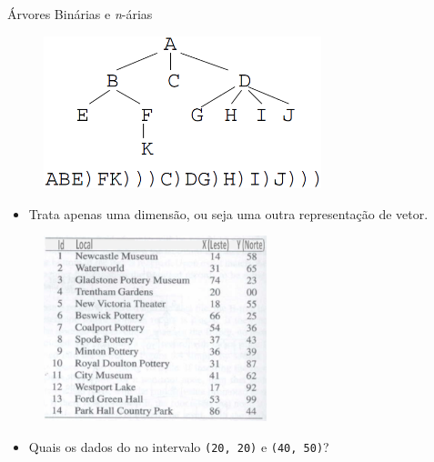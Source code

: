 \documentclass[red, tikz, aspectratio=169, xcolor=dvipsnames]{beamer}
\let\olditem=\item%
\renewcommand{\item}{\olditem \justifying}
\begin{document}
		\begin{frame}{Árvores Binárias e \textit{n}-árias}
			\begin{figure}
				\centering
				\label{fig:uso_4}
				\includegraphics[width=0.72\textwidth]{img/n-tree.png}
			\end{figure}
			\begin{itemize}
				\item Trata apenas uma dimensão, ou seja uma outra representação de vetor.
			\end{itemize}
		\end{frame}
	
		\begin{frame}
			\begin{figure}
				\centering
				\label{fig:vetorial_data_23}
				\includegraphics[width=0.58\textwidth]{img/address.png}
			\end{figure}
					\pause
			\begin{itemize}
				\item Quais os dados do no intervalo \texttt{(20, 20)} e \texttt{(40, 50)}?
			\end{itemize}
		\end{frame}
	
\end{document}
